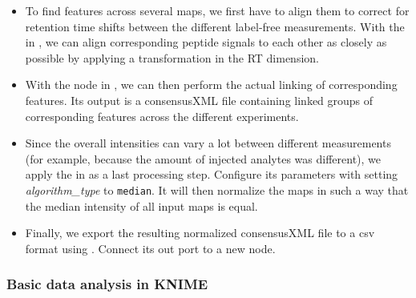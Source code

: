 \begin{itemize}
    \item To find features across several maps, we first have to align them to correct for retention time shifts between the different label-free measurements. With the  in , we can align corresponding peptide signals to each other as closely as possible by applying a transformation in the RT dimension. 
    \item With the  node in , we can then perform the actual linking of corresponding features. Its output is a consensusXML file containing linked groups of corresponding features across the different experiments.
    \item Since the overall intensities can vary a lot between different measurements (for example, because the amount of injected analytes was different), we apply the  in  as a last processing step. Configure its parameters with setting \textit{algorithm\_type} to \texttt{median}. It will then normalize the maps in such a way that the median intensity of all input maps is equal.
    \item Finally, we export the resulting normalized consensusXML file to a csv format using . Connect its out port to a new  node.
\end{itemize}

\subsubsection{Basic data analysis in KNIME}

